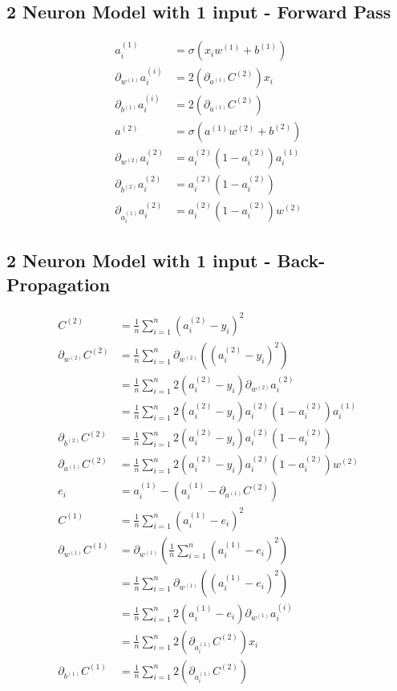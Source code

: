 \documentclass{article}
\numberwithin{equation}{subsection}
\begin{document}
\subsection{2 Neuron Model with 1 input - Forward Pass}

\begin{align}
  a_i^{(1)} &= \sigma(x_i w^{(1)} + b^{(1)}) \\
  \partial_{w^{(1)}}a_i^{(i)} &= 2(\partial_{a^{(1)}}C^{(2)})x_i \\
  \partial_{b^{(1)}}a_i^{(i)} &= 2(\partial_{a^{(1)}}C^{(2)}) \\
  a^{(2)} &= \sigma(a^{(1)}w^{(2)} + b^{(2)}) \\
  \partial_{w^{(2)}}a_i^{(2)} &= a_i^{(2)}(1-a_i^{(2)})a_i^{(1)} \\  
  \partial_{b^{(2)}}a_i^{(2)} &= a_i^{(2)}(1-a_i^{(2)}) \\
  \partial_{a_i^{(1)}}a_i^{(2)} &= a_i^{(2)}(1-a_i^{(2)})w^{(2)}
\end{align}

\subsection{2 Neuron Model with 1 input - Back-Propagation}
\begin{align}
  C^{(2)} &= \frac{1}{n}\sum_{i=1}^{n}(a_i^{(2)} - y_i)^2 \\
  \partial_{w^{(2)}}C^{(2)} &= \frac{1}{n}\sum_{i=1}^{n} \partial_{w^{(2)}} ((a_i^{(2)} - y_i)^2) \\
            &= \frac{1}{n}\sum_{i=1}^{n}2(a_i^{(2)}-y_i)\partial_{w^{(2)}}a_i^{(2)} \\
            &= \frac{1}{n}\sum_{i=1}^{n}2(a_i^{(2)}-y_i)a_i^{(2)}(1-a_i^{(2)})a_i^{(1)} \\
  \partial_{b^{(2)}}C^{(2)} &= \frac{1}{n}\sum_{i=1}^{n}2(a_i^{(2)}-y_i)a_i^{(2)}(1-a_i^{(2)}) \\
  \partial_{a^{(1)}}C^{(2)} &= \frac{1}{n}\sum_{i=1}^{n}2(a_i^{(2)}-y_i)a_i^{(2)}(1-a_i^{(2)})w^{(2)} \\
  e_i &= a_i^{(1)} - (a_i^{(1)} - \partial_{a^{(1)}}C^{(2)}) \\
  C^{(1)} &= \frac{1}{n}\sum_{i=1}^{n}(a_i^{(1)} - e_i)^2 \\
  \partial_{w^{(1)}}C^{(1)} &= \partial_{w^{(1)}}\left(\frac{1}{n}\sum_{i=1}^{n}  (a_i^{(1)} - e_i)^2\right) \\
          &= \frac{1}{n}\sum_{i=1}^{n} \partial_{w^{(1)}}\left((a_i^{(1)} - e_i)^2\right) \\
            &= \frac{1}{n}\sum_{i=1}^{n} 2(a_i^{(1)} - e_i) \partial_{w^{(1)}}a_i^{(i)}\\
            &= \frac{1}{n}\sum_{i=1}^{n} 2(\partial_{a_i^{(1)}}C^{(2)})x_i \\  
  \partial_{b^{(1)}}C^{(1)} &= \frac{1}{n}\sum_{i=1}^{n} 2(\partial_{a_i^{(1)}}C^{(2)})
\end{align}
\end{document}
